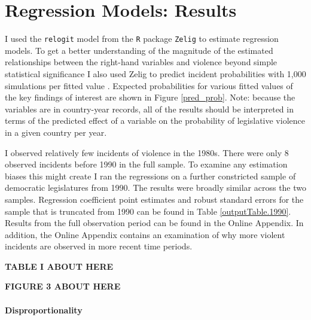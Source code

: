 \documentclass[a4paper]{article}\usepackage[]{graphicx}\usepackage[]{color}
\begin{document}


\section*{Regression Models: Results}

I used the {\tt{relogit}} model from the {\tt{R}} package {\tt{Zelig}} \citep{IMAIKingZelig2008} to estimate regression models. To get a better understanding of the magnitude of the estimated relationships between the right-hand variables and violence beyond simple statistical significance \citep{ward2010perils} I also used Zelig to predict incident probabilities with 1,000 simulations per fitted value \citep[]{King2002}. Expected probabilities for various fitted values of the key findings of interest are shown in Figure \ref{pred_prob}. Note: because the variables are in country-year records, all of the results should be interpreted in terms of the predicted effect of a variable on the probability of legislative violence in a given country per year.

I observed relatively few incidents of violence in the 1980s. There were only 8 observed incidents before 1990 in the full sample. To examine any estimation biases this might create I ran the regressions on a further constricted sample of democratic legislatures from 1990. The results were broadly similar across the two samples. Regression coefficient point estimates and robust standard errors for the sample that is truncated from 1990 can be found in Table \ref{outputTable.1990}. Results from the full observation period can be found in the Online Appendix. In addition, the Online Appendix contains an examination of why more violent incidents are observed in more recent time periods.

\vspace{0.5cm}

\textbf{TABLE I ABOUT HERE}

\vspace{0.5cm}

\textbf{FIGURE 3 ABOUT HERE}

\vspace{0.5cm}


\paragraph{Disproportionality}
\end{document}
